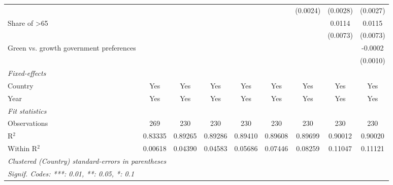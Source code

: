 \begin{table}[htbp]
\begin{tabular}{lcccccccc}
                                                       &          &          &          &          &          & (0.0024)     & (0.0028)      & (0.0027)\\   
      Share of >65                                     &          &          &          &          &          &              & 0.0114        & 0.0115\\   
                                                       &          &          &          &          &          &              & (0.0073)      & (0.0073)\\   
      Green vs. growth government preferences          &          &          &          &          &          &              &               & -0.0002\\   
                                                       &          &          &          &          &          &              &               & (0.0010)\\   
      \midrule
      \emph{Fixed-effects}\\
      Country                                          & Yes      & Yes      & Yes      & Yes      & Yes      & Yes          & Yes           & Yes\\  
      Year                                             & Yes      & Yes      & Yes      & Yes      & Yes      & Yes          & Yes           & Yes\\  
      \midrule
      \emph{Fit statistics}\\
      Observations                                     & 269      & 230      & 230      & 230      & 230      & 230          & 230           & 230\\  
      R$^2$                                            & 0.83335  & 0.89265  & 0.89286  & 0.89410  & 0.89608  & 0.89699      & 0.90012       & 0.90020\\  
      Within R$^2$                                     & 0.00618  & 0.04390  & 0.04583  & 0.05686  & 0.07446  & 0.08259      & 0.11047       & 0.11121\\  
      \midrule \midrule
      \multicolumn{9}{l}{\emph{Clustered (Country) standard-errors in parentheses}}\\
      \multicolumn{9}{l}{\emph{Signif. Codes: ***: 0.01, **: 0.05, *: 0.1}}\\
   \end{tabular}
\end{table}



